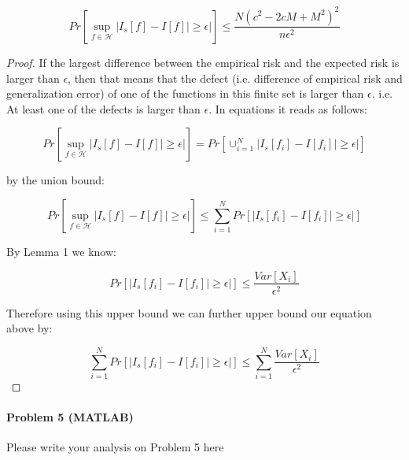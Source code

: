 \documentclass[12pt]{report}
\begin{document}
$$Pr[ \sup\limits_{f \in \mathcal{H}}  | I_s[f] - I[f] | \geq \epsilon|] \leq \frac{N(c^2-2cM+M^2)^2}{n \epsilon^2}$$
\begin{proof}

If the largest difference between the empirical risk and the expected risk is larger than $\epsilon$, then that means that the defect (i.e. difference of empirical risk and generalization error) of one of the functions in this finite set is larger than $\epsilon.$ 
i.e. At least one of the defects is larger than $\epsilon$. In equations it reads as follows:

$$Pr[ \sup\limits_{f \in \mathcal{H}}  | I_s[f] - I[f] | \geq \epsilon|] = Pr[\cup^{N}_{i=1} | I_s[f_i] - I[f_i] | \geq \epsilon|] $$

by the union bound:

$$Pr[ \sup\limits_{f \in \mathcal{H}}  | I_s[f] - I[f] | \geq \epsilon|]  \leq \sum^{N}_{i=1} Pr[| I_s[f_i] - I[f_i] | \geq \epsilon|] $$

By Lemma 1 we know:

$$ Pr[ | I_s[f_i] - I[f_i] | \geq \epsilon|] \leq \frac{ Var[X_i] }{ \epsilon^2 } $$

Therefore using this upper bound we can further upper bound our equation above by:

$$ \sum^{N}_{i=1} Pr[| I_s[f_i] - I[f_i] | \geq \epsilon|] \leq \sum^{N}_{i=1} \frac{ Var[X_i] }{ \epsilon^2 }$$


\end{proof}


\paragraph{Problem 5 (MATLAB)}
Please write your analysis on Problem 5 here
\end{document}
